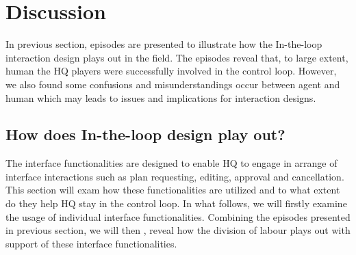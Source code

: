 \section{Discussion}

In previous section, episodes are presented to illustrate how the In-the-loop interaction design plays out in the field.  The episodes reveal that, to large extent, human the HQ players were successfully involved in the control loop. However, we also found some confusions and misunderstandings occur between agent and human which may leads to issues and implications for interaction designs.  \\

\subsection{How does In-the-loop design play out?}
The interface functionalities are designed to enable HQ to engage in arrange of interface interactions such as plan requesting, editing, approval and cancellation. This section will exam how these functionalities are utilized and to what extent do they help HQ stay in the control loop. In what follows, we will firstly examine the usage of individual interface functionalities. Combining the episodes presented in previous section, we will then , reveal how the division of labour plays out with support of these interface functionalities.  \\

